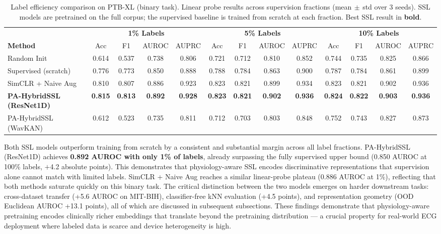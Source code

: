 \documentclass[journal,10pt]{IEEEtran}
\newcommand{\method}{PA-HybridSSL}
\begin{document}
\begin{table}[t]
\centering
\caption{Label efficiency comparison on PTB-XL (binary task). Linear probe results across supervision fractions (mean$\,\pm\,$std over 3 seeds). SSL models are pretrained on the full corpus; the supervised baseline is trained from scratch at each fraction. Best SSL result in \textbf{bold}.}
\label{tab:main_results}
\begin{tabular}{l|cccc|cccc|cccc}
\toprule
& \multicolumn{4}{c|}{\textbf{1\% Labels}} & \multicolumn{4}{c|}{\textbf{5\% Labels}} & \multicolumn{4}{c}{\textbf{10\% Labels}} \\
\textbf{Method} & Acc & F1 & AUROC & AUPRC & Acc & F1 & AUROC & AUPRC & Acc & F1 & AUROC & AUPRC \\
\midrule
Random Init        & 0.614 & 0.537 & 0.738 & 0.806 & 0.721 & 0.712 & 0.810 & 0.852 & 0.744 & 0.735 & 0.825 & 0.866 \\
Supervised (scratch) & 0.776 & 0.773 & 0.850 & 0.888 & 0.788 & 0.784 & 0.863 & 0.900 & 0.787 & 0.784 & 0.861 & 0.899 \\
\midrule
SimCLR + Naive Aug & 0.810 & 0.807 & 0.886 & 0.923 & 0.823 & 0.821 & 0.899 & 0.934 & 0.823 & 0.821 & 0.902 & 0.936 \\
\textbf{\method{} (ResNet1D)} & \textbf{0.815} & \textbf{0.813} & \textbf{0.892} & \textbf{0.928} & \textbf{0.823} & \textbf{0.821} & \textbf{0.902} & \textbf{0.936} & \textbf{0.824} & \textbf{0.822} & \textbf{0.903} & \textbf{0.936} \\
\method{} (WavKAN)  & 0.612 & 0.523 & 0.735 & 0.811 & 0.712 & 0.703 & 0.803 & 0.848 & 0.752 & 0.743 & 0.827 & 0.873 \\
\bottomrule
\end{tabular}
\vspace{-0.5em}
\end{table}

\vspace{0.3em}
\noindent Both SSL models outperform training from scratch by a consistent and substantial margin across all label fractions. PA-HybridSSL (ResNet1D) achieves \textbf{0.892 AUROC with only 1\% of labels}, already surpassing the fully supervised upper bound (0.850 AUROC at 100\% labels, $+$4.2 absolute points). This demonstrates that physiology-aware SSL encodes discriminative representations that supervision alone cannot match with limited labels. SimCLR + Naive Aug reaches a similar linear-probe plateau (0.886 AUROC at 1\%), reflecting that both methods saturate quickly on this binary task. The critical distinction between the two models emerges on harder downstream tasks: cross-dataset transfer (+5.6 AUROC on MIT-BIH), classifier-free kNN evaluation (+4.5 points), and representation geometry (OOD Euclidean AUROC +13.1 points), all of which are discussed in subsequent subsections. These findings demonstrate that physiology-aware pretraining encodes clinically richer embeddings that translate beyond the pretraining distribution --- a crucial property for real-world ECG deployment where labeled data is scarce and device heterogeneity is high.
\end{document}
